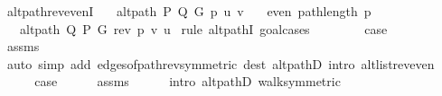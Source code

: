 \begin{isabellebody}
{\isafoldproof}%
%
\isadelimproof
%
\endisadelimproof
\isanewline
%
\isadeliminvisible
\isanewline
%
\endisadeliminvisible
%
\isataginvisible
{}\isamarkupfalse%
\ alt{\isacharunderscore}{\kern0pt}path{\isacharunderscore}{\kern0pt}rev{\isacharunderscore}{\kern0pt}evenI{\isacharcolon}{\kern0pt}\isanewline
\ \ \ {\isachardoublequoteopen}alt{\isacharunderscore}{\kern0pt}path\ P\ Q\ G\ p\ u\ v{\isachardoublequoteclose}\isanewline
\ \ \ {\isachardoublequoteopen}even\ {\isacharparenleft}{\kern0pt}path{\isacharunderscore}{\kern0pt}length\ p{\isacharparenright}{\kern0pt}{\isachardoublequoteclose}\isanewline
\ \ \ {\isachardoublequoteopen}alt{\isacharunderscore}{\kern0pt}path\ Q\ P\ G\ {\isacharparenleft}{\kern0pt}rev\ p{\isacharparenright}{\kern0pt}\ v\ u{\isachardoublequoteclose}%
\endisataginvisible
{\isafoldinvisible}%
%
\isadeliminvisible
%
\endisadeliminvisible
\isanewline
%
\isadelimproof
%
\endisadelimproof
%
\isatagproof
{}\isamarkupfalse%
\ {\isacharparenleft}{\kern0pt}rule\ alt{\isacharunderscore}{\kern0pt}pathI{\isacharcomma}{\kern0pt}\ goal{\isacharunderscore}{\kern0pt}cases{\isacharparenright}{\kern0pt}\isanewline
\ \ \isamarkupfalse%
\ {}\isanewline
\ \ \isamarkupfalse%
\ {\isacharquery}{\kern0pt}case\isanewline
\ \ \ \ \isamarkupfalse%
\ assms\isanewline
\ \ \ \ \isamarkupfalse%
\ {\isacharparenleft}{\kern0pt}auto\ simp\ add{\isacharcolon}{\kern0pt}\ edges{\isacharunderscore}{\kern0pt}of{\isacharunderscore}{\kern0pt}path{\isacharunderscore}{\kern0pt}rev{\isacharbrackleft}{\kern0pt}symmetric{\isacharbrackright}{\kern0pt}\ dest{\isacharcolon}{\kern0pt}\ alt{\isacharunderscore}{\kern0pt}pathD{\isacharparenleft}{\kern0pt}{}{\isacharparenright}{\kern0pt}\ intro{\isacharcolon}{\kern0pt}\ alt{\isacharunderscore}{\kern0pt}list{\isacharunderscore}{\kern0pt}rev{\isacharunderscore}{\kern0pt}even{\isacharparenright}{\kern0pt}\isanewline
{}\isamarkupfalse%
\isanewline
\ \ \isamarkupfalse%
\ {}\isanewline
\ \ \isamarkupfalse%
\ {\isacharquery}{\kern0pt}case\isanewline
\ \ \ \ \isamarkupfalse%
\ assms{\isacharparenleft}{\kern0pt}{}{\isacharparenright}{\kern0pt}\isanewline
\ \ \ \ \isamarkupfalse%
\ {\isacharparenleft}{\kern0pt}intro\ alt{\isacharunderscore}{\kern0pt}pathD{\isacharparenleft}{\kern0pt}{}{\isacharparenright}{\kern0pt}\ walk{\isacharunderscore}{\kern0pt}symmetric{\isacharparenright}{\kern0pt}\isanewline

\end{isabellebody}
